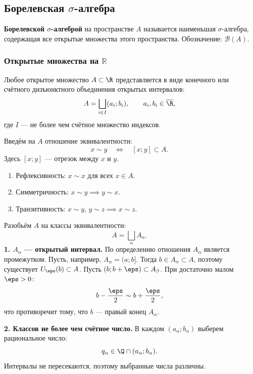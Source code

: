 \subsection{Борелевская \texorpdfstring{$\sigma$}{σ}-алгебра}

\begin{definition}
    \textbf{Борелевской $\sigma$-алгеброй} на пространстве $A$
    называется наименьшая $\sigma$-алгебра, содержащая все
    открытые множества этого пространства.
    Обозначение: $\mathcal{B}(A)$.
\end{definition}

\subsubsection{Открытые множества на \texorpdfstring{$\mathbb{R}$}{R}}

\begin{theorem}
    Любое открытое множество $A\subset\R$ представляется
    в виде конечного или счётного дизъюнктного объединения
    открытых интервалов:
    \[
        A=\bigsqcup_{i\in I}(a_i;b_i),
        \qquad a_i,b_i\in\overline{\R},
    \]
    где $I$ --- не более чем счётное множество индексов.
\end{theorem}

\begin{Proof}
    Введём на $A$ отношение эквивалентности:
    \[
        x\sim y \quad\Longleftrightarrow\quad [x;y]\subset A.
    \]
    Здесь $[x;y]$ --- отрезок между $x$ и $y$.
    \begin{enumerate}[label=\arabic*)]
        \item Рефлексивность: $x\sim x$ для всех $x\in A$.
        \item Симметричность: $x\sim y\implies y\sim x$.
        \item Транзитивность:
        $x\sim y$, $y\sim z\implies x\sim z$.
    \end{enumerate}
    Разобьём $A$ на классы эквивалентности:
    \[
        A=\bigsqcup_{\alpha} A_\alpha.
    \]
    \textbf{1. $A_\alpha$ --- открытый интервал.}
    По определению отношения $A_\alpha$ является промежутком.
    Пусть, например, $A_\alpha=(a;b]$.
    Тогда $b\in A_\alpha\subset A$, поэтому
    существует $U_\eps(b)\subset A$.
    Пусть $(b;b+\eps)\subset A_\beta$.
    При достаточно малом $\eps>0$:
    \[
        b-\frac{\eps}{2}\sim b+\frac{\eps}{2},
    \]
    что противоречит тому, что $b$ --- правый конец $A_\alpha$.

    \textbf{2. Классов не более чем счётное число.}
    В каждом $(a_\alpha;b_\alpha)$ выберем рациональное число:
    \[
        q_\alpha\in\Q\cap(a_\alpha;b_\alpha).
    \]
    Интервалы не пересекаются, поэтому выбранные числа различны.
\end{Proof}

